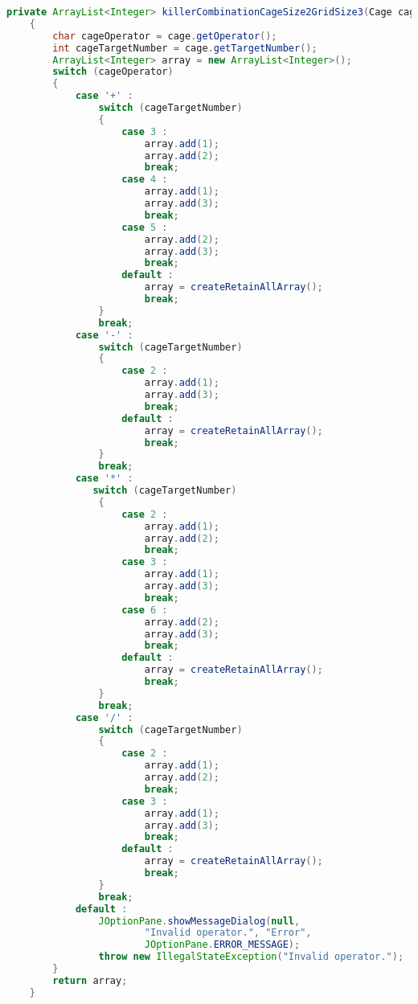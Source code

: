 \begin{lstlisting}[language=Java,basicstyle=\tiny,caption=SolverRuleBased.java]
    private ArrayList<Integer> killerCombinationCageSize2GridSize3(Cage cage)
    {
        char cageOperator = cage.getOperator();
        int cageTargetNumber = cage.getTargetNumber();
        ArrayList<Integer> array = new ArrayList<Integer>();
        switch (cageOperator)
        {
            case '+' :
                switch (cageTargetNumber)
                {
                    case 3 :
                        array.add(1);
                        array.add(2);
                        break;
                    case 4 :  
                        array.add(1);
                        array.add(3);
                        break;
                    case 5 :
                        array.add(2);
                        array.add(3);
                        break;
                    default :
                        array = createRetainAllArray();
                        break;
                }
                break;
            case '-' :
                switch (cageTargetNumber)
                {
                    case 2 :
                        array.add(1);
                        array.add(3);
                        break;
                    default :
                        array = createRetainAllArray();
                        break;
                }
                break;
            case '*' :
               switch (cageTargetNumber)
                {
                    case 2 :
                        array.add(1);
                        array.add(2);
                        break;
                    case 3 :
                        array.add(1);
                        array.add(3);
                        break;
                    case 6 :
                        array.add(2);
                        array.add(3);
                        break;
                    default :
                        array = createRetainAllArray();
                        break;
                }
                break;
            case '/' :
                switch (cageTargetNumber)
                {
                    case 2 :
                        array.add(1);
                        array.add(2);
                        break;
                    case 3 :
                        array.add(1);
                        array.add(3);
                        break;
                    default :
                        array = createRetainAllArray();
                        break;
                }
                break;
            default :
                JOptionPane.showMessageDialog(null, 
                        "Invalid operator.", "Error", 
                        JOptionPane.ERROR_MESSAGE);
                throw new IllegalStateException("Invalid operator.");
        }
        return array;
    }
    

\end{lstlisting}
